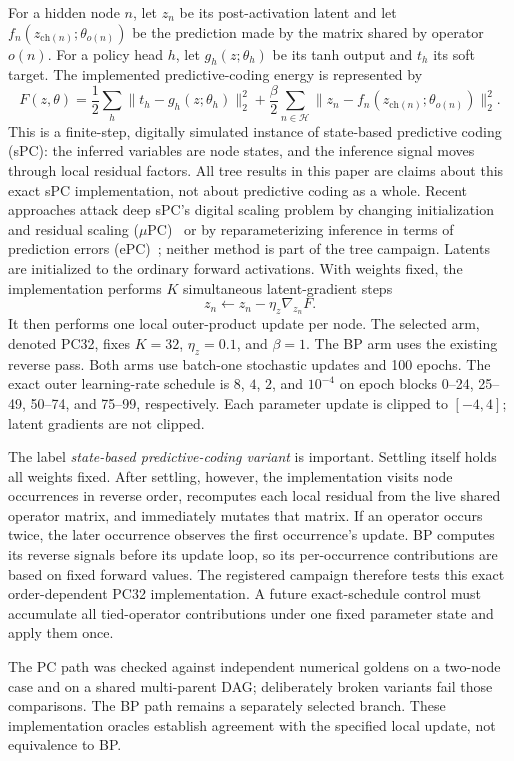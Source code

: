 \documentclass[11pt]{article}
\begin{document}
For a hidden node $n$, let $z_n$ be its post-activation latent and let
$f_n(z_{\mathrm{ch}(n)};\theta_{o(n)})$ be the prediction made by the matrix shared by
operator $o(n)$.  For a policy head $h$, let $g_h(z;\theta_h)$ be its tanh output and
$t_h$ its soft target.  The implemented predictive-coding energy is represented by
\[
  F(z,\theta)
  = \frac{1}{2}\sum_h \lVert t_h-g_h(z;\theta_h)\rVert_2^2
    + \frac{\beta}{2}\sum_{n\in\mathcal H}
       \lVert z_n-f_n(z_{\mathrm{ch}(n)};\theta_{o(n)})\rVert_2^2 .
\]
This is a finite-step, digitally simulated instance of state-based predictive coding
(sPC): the inferred variables are node states, and the inference signal moves through
local residual factors.  All tree results in this paper are claims about this exact sPC
implementation, not about predictive coding as a whole.  Recent approaches attack deep
sPC's digital scaling problem by changing initialization and residual scaling
($\mu$PC)~\cite{innocenti2025mupc} or by reparameterizing inference in terms of prediction
errors (ePC)~\cite{goemaere2026epc}; neither method is part of the tree campaign.
Latents are initialized to the ordinary forward activations.  With weights fixed, the
implementation performs $K$ simultaneous latent-gradient steps
\[
  z_n \leftarrow z_n-\eta_z\nabla_{z_n}F .
\]
It then performs one local outer-product update per node.  The selected arm, denoted PC32,
fixes $K=32$, $\eta_z=0.1$, and $\beta=1$.  The BP arm uses the existing reverse pass.
Both arms use batch-one stochastic updates and 100 epochs.  The exact outer learning-rate
schedule is $8$, $4$, $2$, and $10^{-4}$ on epoch blocks 0--24, 25--49, 50--74, and
75--99, respectively.  Each parameter update is clipped to $[-4,4]$; latent gradients are
not clipped.

The label \emph{state-based predictive-coding variant} is important.  Settling itself holds all weights
fixed.  After settling, however, the implementation visits node occurrences in reverse
order, recomputes each local residual from the live shared operator matrix, and immediately
mutates that matrix.  If an operator occurs twice, the later occurrence observes the first
occurrence's update.  BP computes its reverse signals before its update loop, so its
per-occurrence contributions are based on fixed forward values.  The registered campaign
therefore tests this exact order-dependent PC32 implementation.  A future exact-schedule
control must accumulate all tied-operator contributions under one fixed parameter state
and apply them once.

The PC path was checked against independent numerical goldens on a two-node case and on a
shared multi-parent DAG; deliberately broken variants fail those comparisons.  The BP path
remains a separately selected branch.  These implementation oracles establish agreement
with the specified local update, not equivalence to BP.
\end{document}
